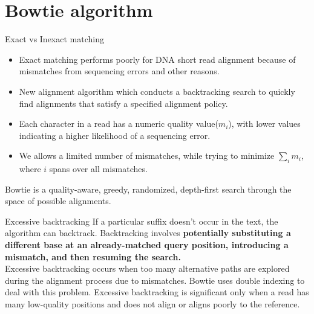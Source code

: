 \documentclass[mathserif]{beamer}
\begin{document}
\section{Bowtie algorithm}
\begin{frame}{Exact vs Inexact matching}
    \begin{itemize}
        \item Exact matching performs poorly for DNA short read alignment because of mismatches from 
        sequencing errors and other reasons.
        \item New alignment algorithm which conducts a backtracking search to
        quickly find alignments that satisfy a specified alignment policy. 
        \item Each character in a read has a numeric quality value($m_i$), with
        lower values indicating a higher likelihood of a sequencing
        error. 
        \item We allows a limited number of mismatches, while trying to minimize $\sum_i m_i$, 
        where $i$ spans over all mismatches. 
    \end{itemize} 
    Bowtie is a quality-aware, greedy, randomized, depth-first search through the
    space of possible alignments.
\end{frame}

\begin{frame}{Excessive backtracking}
    If a particular suffix doesn't occur in the 
    text, the algorithm can backtrack. Backtracking involves \textbf{potentially substituting 
    a different base at an already-matched query position, introducing a mismatch, and 
    then resuming the search.}\\
\vspace{5mm}
    Excessive backtracking occurs when too many alternative paths are explored during the alignment 
    process due to mismatches. Bowtie uses double indexing to deal with this problem.
    Excessive backtracking is significant only when a read has many low-quality 
    positions and does not align or aligns poorly to the reference.
\end{frame}
\end{document}
